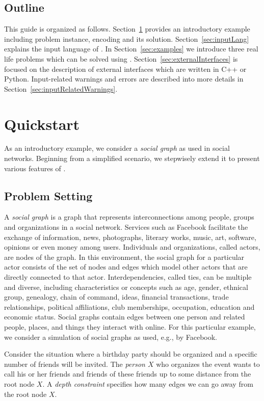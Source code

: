 \documentclass[a4paper, titlepage]{article}
\begin{document}
\subsection{Outline}
This guide is organized as follows. Section~\ref{sec:quick} 
provides an introductory example including
problem instance, encoding and its solution.
Section~\ref{sec:inputLang} explains the input language of \dlvhex{}.
In Section~\ref{sec:examples} we 
introduce three real life problems which can be solved 
using \hex{}. Section~\ref{sec:externalInterfaces} is 
focused on the description of external interfaces which are 
written in C++ or Python. Input-related warnings and errors 
are described into more details in 
Section~\ref{sec:inputRelatedWarnings}.

\section{Quickstart} %
\label{sec:quick}
As an introductory example, we consider a \emph{social 
graph} as used in social networks. Beginning from a 
simplified scenario, we stepwisely extend it to present 
various features of \dlvhex{}.

\subsection{Problem Setting}
A \emph{social graph} is a graph that represents 
interconnections among people, groups 
and organizations in a social network. Services such as 
Facebook facilitate the exchange 
of information, news, photographs, literary works, music, 
art, software, opinions or even 
money among users. 
Individuals and organizations, called actors, are nodes of 
the graph.
In this environment, the social graph 
for a particular actor consists 
of the set of nodes and edges which model other actors that 
are directly connected to that actor. 
Interdependencies, 
called ties, can be multiple and diverse, including 
characteristics or concepts such as age, 
gender, ethnical group, genealogy, chain of command, ideas, financial 
transactions, trade relationships, 
political affiliations, club memberships, occupation, 
education and economic status. 
Social graphs contain edges between one person and related 
people, places, and things they interact 
with online. For this particular example, we consider a 
simulation of social graphs as used, e.g., by Facebook. 

Consider the situation where a birthday party should be 
organized and a specific number of friends will be invited. 
The \emph{person $X$} who organizes the event wants to 
call his or her friends and friends of these friends up to 
some distance from the root node $X$. A \emph{depth 
constraint} specifies how many edges we can go away from 
the root node $X$.
 
\end{document}
